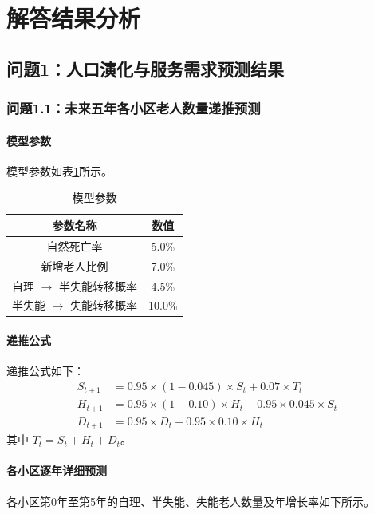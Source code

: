 \documentclass[UTF8]{ctexart}
\begin{document}
\newpage
\newpage

\section{解答结果分析}

\subsection{问题1：人口演化与服务需求预测结果}

\subsubsection{问题1.1：未来五年各小区老人数量递推预测}

\paragraph{模型参数}
模型参数如表\ref{tab:params_1_1}所示。

\begin{table}[H]
\centering
\caption{模型参数}
\label{tab:params_1_1}
\renewcommand{\arraystretch}{1.3}
\begin{tabular}{|c|c|}
\hline
\textbf{参数名称} & \textbf{数值} \\
\hline
自然死亡率 & 5.0\% \\
\hline
新增老人比例 & 7.0\% \\
\hline
自理 $\to$ 半失能转移概率 & 4.5\% \\
\hline
半失能 $\to$ 失能转移概率 & 10.0\% \\
\hline
\end{tabular}
\end{table}

\paragraph{递推公式}
递推公式如下：
\begin{equation}
\begin{aligned}
S_{t+1} &= 0.95 \times (1-0.045) \times S_t + 0.07 \times T_t \\
H_{t+1} &= 0.95 \times (1-0.10) \times H_t + 0.95 \times 0.045 \times S_t \\
D_{t+1} &= 0.95 \times D_t + 0.95 \times 0.10 \times H_t
\end{aligned}
\end{equation}
其中 $T_t = S_t + H_t + D_t$。

\paragraph{各小区逐年详细预测}
各小区第0年至第5年的自理、半失能、失能老人数量及年增长率如下所示。
\end{document}
